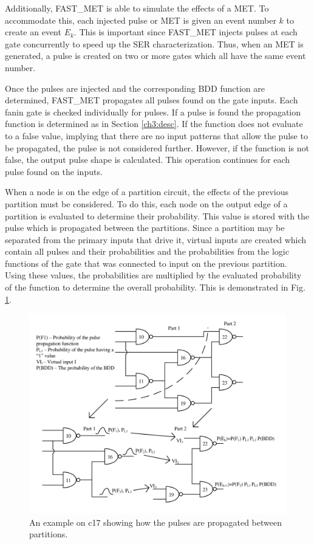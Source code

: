 Additionally, FAST\_MET is able to simulate the effects of a MET. To accommodate this, each injected pulse or MET is given an event number $k$ to create an event $E_k$. This is important since FAST\_MET injects pulses at each gate concurrently to speed up the SER characterization. Thus, when an MET is generated, a pulse is created on two or more gates which all have the same event number.

Once the pulses are injected and the corresponding BDD function are determined, FAST\_MET propagates all pulses found on the gate inputs. Each fanin gate is checked individually for pulses. If a pulse is found the propagation function is determined as in Section \ref{ch3:desc}. If the function does not evaluate to a false value, implying that there are no input patterns that allow the pulse to be propagated, the pulse is not considered further. However, if the function is not false, the output pulse shape is calculated. This operation continues for each pulse found on the inputs. 

When a node is on the edge of a partition circuit, the effects of the previous partition must be considered. To do this, each node on the output edge of a partition is evaluated to determine their probability. This value is stored with the pulse which is propagated between the partitions. Since a partition may be separated from the primary inputs that drive it, virtual inputs are created which contain all pulses and their probabilities and the probabilities from the logic functions of the gate that was connected to input on the previous partition. Using these values, the probabilities are multiplied by the evaluated probability of the function to determine the overall probability. This is demonstrated in Fig. \ref{PART_PROP}.

\begin{figure}[!htbp]
	\centering
	\includegraphics[width=\linewidth]{Figures/PartProp}
	\caption{An example on c17 showing how the pulses are propagated between partitions.}
	\label{PART_PROP}
\end{figure}

